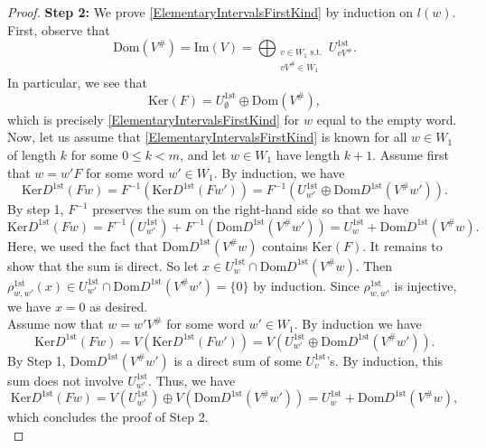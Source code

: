 \documentclass[10pt,a4paper]{amsart}
\begin{document}
\begin{proof}
    \textbf{Step 2:} We prove \eqref{ElementaryIntervalsFirstKind} by induction on $l(w)$. First, observe that
    \begin{equation*}
        \mathrm{Dom}(V^{\#}) = \mathrm{Im}(V) = \bigoplus_{\substack{v \in W_1 \text{ s.t.} \\ vV^{\#} \in W_1}} U^{1\mathrm{st}}_{vV^{\#}}.
    \end{equation*}
     In particular, we see that 
    \begin{equation*}
        \mathrm{Ker}(F) =  U^{1\mathrm{st}}_{\emptyset} \oplus \mathrm{Dom}(V^{\#}),
    \end{equation*}
    which is precisely \eqref{ElementaryIntervalsFirstKind} for $w$ equal to the empty word. Now, let us assume that \eqref{ElementaryIntervalsFirstKind} is known for all $w \in W_1$ of length $k$ for some $0 \leq k < m$, and let $w \in W_1$ have length $k+1$. Assume first that $w = w'F$ for some word $w' \in W_1$. By induction, we have
    \begin{equation*}
        \mathrm{Ker}D^{1\mathrm{st}}(Fw) = F^{-1}(\mathrm{Ker}D^{1\mathrm{st}}(Fw')) = F^{-1}\left( U^{1\mathrm{st}}_{w'} \oplus \mathrm{Dom} D^{1\mathrm{st}}(V^{\#}w')\right).
    \end{equation*}
    By step 1, $F^{-1}$ preserves the sum on the right-hand side so that we have 
    \begin{equation*}
        \mathrm{Ker}D^{1\mathrm{st}}(Fw) = F^{-1}(U^{1\mathrm{st}}_{w'}) + F^{-1}(\mathrm{Dom} D^{1\mathrm{st}}(V^{\#}w')) = U_{w}^{1\mathrm{st}} + \mathrm{Dom}D^{1\mathrm{st}}(V^{\#}w).
    \end{equation*}
    \sloppy Here, we used the fact that $\mathrm{Dom}D^{1\mathrm{st}}(V^{\#}w)$ contains $\mathrm{Ker}(F)$. It remains to show that the sum is direct. So let $x \in U_{w}^{1\mathrm{st}} \cap \mathrm{Dom}D^{1\mathrm{st}}(V^{\#}w)$. Then $\rho_{w,w'}^{1\mathrm{st}}(x) \in U_{w'}^{1\mathrm{st}} \cap \mathrm{Dom} D^{1\mathrm{st}}(V^{\#}w') = \{0\}$ by induction. Since $\rho_{w,w'}^{1\mathrm{st}}$ is injective, we have $x = 0$ as desired. \\
    Assume now that $w = w'V^{\#}$ for some word $w' \in W_1$. By induction we have
    \begin{equation*}
        \mathrm{Ker}D^{1\mathrm{st}}(Fw) = V(\mathrm{Ker}D^{1\mathrm{st}}(Fw')) = V\left( U^{1\mathrm{st}}_{w'} \oplus \mathrm{Dom} D^{1\mathrm{st}}(V^{\#}w')\right).
    \end{equation*}
    By Step 1, $\mathrm{Dom} D^{1\mathrm{st}}(V^{\#}w')$ is a direct sum of some $U^{1\mathrm{st}}_v$'s. By induction, this sum does not involve $U^{1\mathrm{st}}_{w'}$. Thus, we have 
    \begin{equation*}
        \mathrm{Ker}D^{1\mathrm{st}}(Fw) = V(U^{1\mathrm{st}}_{w'}) \oplus V(\mathrm{Dom} D^{1\mathrm{st}}(V^{\#}w')) = U_{w}^{1\mathrm{st}} + \mathrm{Dom}D^{1\mathrm{st}}(V^{\#}w),
    \end{equation*}
    which concludes the proof of Step 2. \\


\end{proof}
\end{document}
